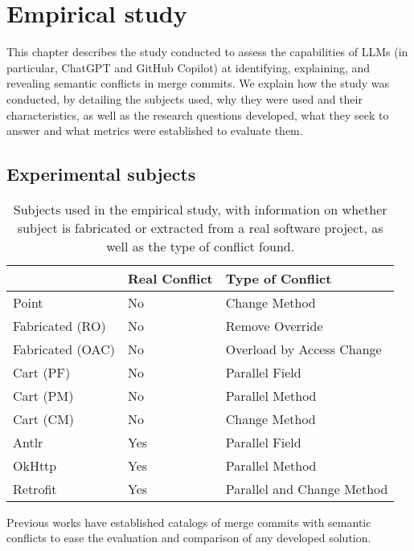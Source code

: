 \chapter{Empirical study}\label{chap:study}

This chapter describes the study conducted to assess the capabilities of LLMs
(in particular, ChatGPT and GitHub Copilot) at identifying, explaining,
and revealing semantic conflicts in merge commits.
We explain how the study was conducted, by detailing the subjects used, why they were used and their characteristics, as well
as the research questions developed, what they seek to answer and what metrics were established to evaluate them.

\section{Experimental subjects}\label{chap:study:subjects}

\begin{table}[t]
\centering
\begin{tabular}{@{\extracolsep{\fill}} lll} \toprule
                 & Real Conflict & Type of Conflict \\
\midrule
Point            & No  & Change Method \\
Fabricated (RO)  & No  & Remove Override \\
Fabricated (OAC) & No  & Overload by Access Change \\
Cart (PF)        & No  & Parallel Field \\
Cart (PM)        & No  & Parallel Method \\
Cart (CM)        & No  & Change Method \\
Antlr            & Yes & Parallel Field \\
OkHttp           & Yes & Parallel Method \\
Retrofit         & Yes & Parallel and Change Method \\
\bottomrule
\end{tabular}
\caption{Subjects used in the empirical study, with information on whether subject is fabricated or extracted from a real software project, as well as the type of conflict found.\label{tab:subjects}}
\end{table}

Previous works have established catalogs of merge commits with semantic conflicts
to ease the evaluation and comparison of any developed solution.

